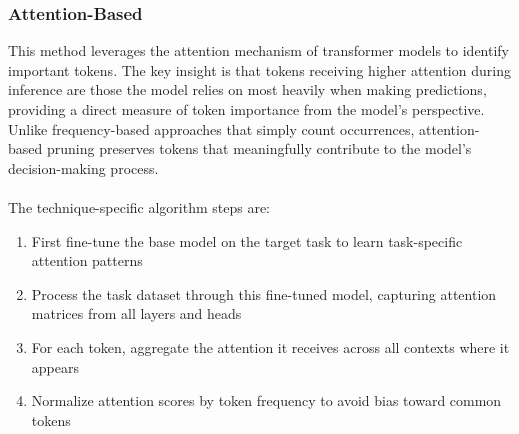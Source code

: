 \documentclass[twocolumn]{article}
\begin{document}

\subsubsection{Attention-Based}
This method leverages the attention mechanism of transformer models to identify important tokens. The key insight is that tokens receiving higher attention during inference are those the model relies on most heavily when making predictions, providing a direct measure of token importance from the model's perspective. Unlike frequency-based approaches that simply count occurrences, attention-based pruning preserves tokens that meaningfully contribute to the model's decision-making process.
\\ \\
The technique-specific algorithm steps are:
\begin{enumerate}
    \item First fine-tune the base model on the target task to learn task-specific attention patterns
    \item Process the task dataset through this fine-tuned model, capturing attention matrices from all layers and heads
    \item For each token, aggregate the attention it receives across all contexts where it appears
    \item Normalize attention scores by token frequency to avoid bias toward common tokens
\end{enumerate}
\end{document}
